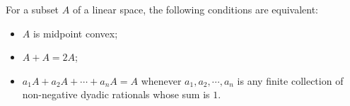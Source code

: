 For a subset $A$ of a linear space, the following conditions are equivalent:
\begin{itemize}
\item[(i)] $A$ is midpoint convex;
\item[(ii)] $A + A = 2A$;
\item[(iii)] $a_1A + a_2A + \cdots + a_nA = A$ whenever $a_1, a_2, \cdots, a_n$ is any finite collection of non-negative dyadic rationals whose sum is $1$.
\end{itemize}
